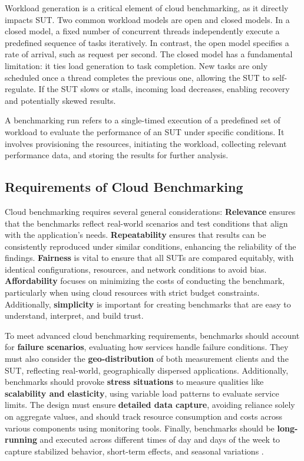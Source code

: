 Workload generation is a critical element of cloud benchmarking, as it directly impacts SUT. Two common workload models are open and closed models. In a closed model, a fixed number of concurrent threads independently execute a predefined sequence of tasks iteratively. In contrast, the open model specifies a rate of arrival, such as request per second. The closed model has a fundamental limitation: it ties load generation to task completion. New tasks are only scheduled once a thread completes the previous one, allowing the SUT to self-regulate. If the SUT slows or stalls, incoming load decreases, enabling recovery and potentially skewed results.

A benchmarking run refers to a single-timed execution of a predefined set of workload to evaluate the performance of an SUT under specific conditions. It involves provisioning the resources, initiating the workload, collecting relevant performance data, and storing the results for further analysis.

\subsection{Requirements of Cloud Benchmarking}
\label{reqs_of_bench}

Cloud benchmarking requires several general considerations: \textbf{Relevance} ensures that the benchmarks reflect real-world scenarios and test conditions that align with the application's needs. \textbf{Repeatability} ensures that results can be consistently reproduced under similar conditions, enhancing the reliability of the findings. \textbf{Fairness} is vital to ensure that all SUTs are compared equitably, with identical configurations, resources, and network conditions to avoid bias. \textbf{Affordability} focuses on minimizing the costs of conducting the benchmark, particularly when using cloud resources with strict budget constraints. Additionally, \textbf{simplicity} is important for creating benchmarks that are easy to understand, interpret, and build trust.

To meet advanced cloud benchmarking requirements, benchmarks should account for \textbf{failure scenarios}, evaluating how services handle failure conditions. They must also consider the \textbf{geo-distribution} of both measurement clients and the SUT, reflecting real-world, geographically dispersed applications. Additionally, benchmarks should provoke \textbf{stress situations} to measure qualities like \textbf{scalability and elasticity}, using variable load patterns to evaluate service limits. The design must ensure \textbf{detailed data capture}, avoiding reliance solely on aggregate values, and should track resource consumption and costs across various components using monitoring tools. Finally, benchmarks should be \textbf{long-running} and executed across different times of day and days of the week to capture stabilized behavior, short-term effects, and seasonal variations \cite{book_bermbach_cloud_service_benchmarking}.

